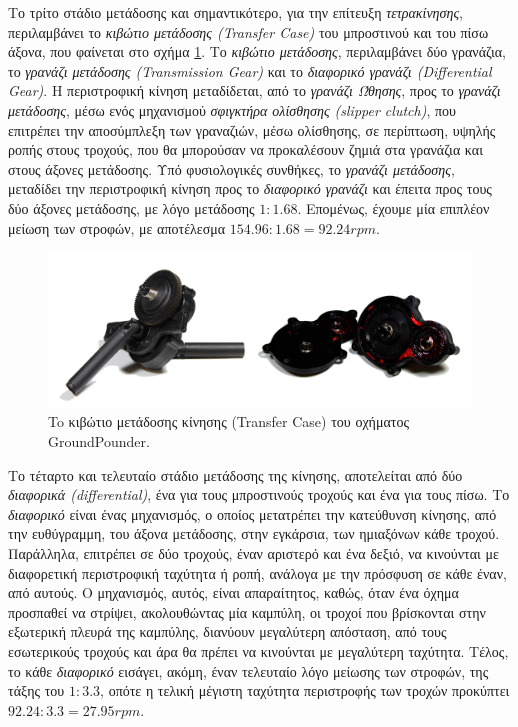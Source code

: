\bigskip
Το τρίτο στάδιο μετάδοσης και σημαντικότερο, για την επίτευξη \textit{τετρακίνησης}, περιλαμβάνει το \textit{κιβώτιο μετάδοσης (Transfer Case)} του μπροστινού και του πίσω άξονα, που φαίνεται στο σχήμα \ref{fig:transfer_case}. Το \textit{κιβώτιο μετάδοσης}, περιλαμβάνει δύο γρανάζια, το \textit{γρανάζι μετάδοσης (Transmission Gear)} και το \textit{διαφορικό γρανάζι (Differential Gear)}. Η περιστροφική κίνηση μεταδίδεται, από το \textit{γρανάζι Ώθησης}, προς το \textit{γρανάζι μετάδοσης}, μέσω ενός μηχανισμού \textit{σφιγκτήρα ολίσθησης (slipper clutch)}, που επιτρέπει την αποσύμπλεξη των γραναζιών, μέσω ολίσθησης, σε περίπτωση, υψηλής ροπής στους τροχούς, που θα μπορούσαν να προκαλέσουν ζημιά στα γρανάζια και στους άξονες μετάδοσης. Υπό φυσιολογικές συνθήκες, το \textit{γρανάζι μετάδοσης}, μεταδίδει την περιστροφική κίνηση προς το \textit{διαφορικό γρανάζι} και έπειτα προς τους δύο άξονες μετάδοσης, με λόγο μετάδοσης $1:1.68$. Επομένως, έχουμε μία επιπλέον μείωση των στροφών, με αποτέλεσμα $154.96:1.68=92.24rpm$.

\begin{figure}[!ht]
	\centering
	\includegraphics[width=0.8\linewidth]{Chapters/Chapter2/Figures/transfer_case.png}
	\caption{To κιβώτιο μετάδοσης κίνησης (Transfer Case) του οχήματος GroundPounder.}
	\label{fig:transfer_case}
\end{figure}

\bigskip
Το τέταρτο και τελευταίο στάδιο μετάδοσης της κίνησης, αποτελείται από δύο \textit{διαφορικά (differential)}, ένα για τους μπροστινούς τροχούς και ένα για τους πίσω. Το \textit{διαφορικό} είναι ένας μηχανισμός, ο οποίος μετατρέπει την κατεύθυνση κίνησης, από την ευθύγραμμη, του άξονα μετάδοσης, στην εγκάρσια, των ημιαξόνων κάθε τροχού. Παράλληλα, επιτρέπει σε δύο τροχούς, έναν αριστερό και ένα δεξιό, να κινούνται με διαφορετική περιστροφική ταχύτητα ή ροπή, ανάλογα με την πρόσφυση σε κάθε έναν, από αυτούς. Ο μηχανισμός, αυτός, είναι απαραίτητος, καθώς, όταν ένα όχημα προσπαθεί να στρίψει, ακολουθώντας μία καμπύλη, οι τροχοί που βρίσκονται στην εξωτερική πλευρά της καμπύλης, διανύουν μεγαλύτερη απόσταση, από τους εσωτερικούς τροχούς και άρα θα πρέπει να κινούνται με μεγαλύτερη ταχύτητα. Τέλος, το κάθε \textit{διαφορικό} εισάγει, ακόμη, έναν τελευταίο λόγο μείωσης των στροφών, της τάξης του $1:3.3$, οπότε η τελική μέγιστη ταχύτητα περιστροφής των τροχών προκύπτει $92.24:3.3=27.95rpm$.

